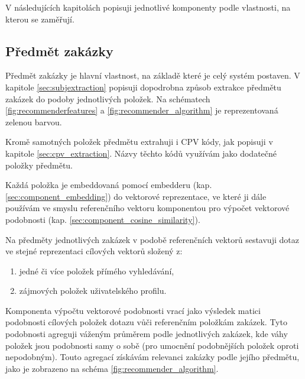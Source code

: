 \documentclass[thesis=M,czech]{FITthesis}[2019/12/23]
\begin{document}
V následujících kapitolách popisuji jednotlivé komponenty podle vlastnosti, na kterou se zaměřují.
\newpage

\subsection{Předmět zakázky}
\label{sec:feature_subject}

Předmět zakázky je hlavní vlastnost, na základě které je celý systém postaven. V kapitole \ref{sec:subjextraction} popisuji dopodrobna způsob extrakce předmětu zakázek do podoby jednotlivých položek. Na schématech \ref{fig:recommenderfeatures} a \ref{fig:recommender_algorithm} je reprezentovaná zelenou barvou.

Kromě samotných položek předmětu extrahuji i CPV kódy, jak popisuji v kapitole \ref{sec:cpv_extraction}. Názvy těchto kódů využívám jako dodatečné položky předmětu.

Každá položka je embeddovaná pomocí embedderu (kap. \ref{sec:component_embedding}) do vektorové reprezentace, ve které ji dále používám ve smyslu referenčního vektoru komponentou pro výpočet vektorové podobnosti (kap. \ref{sec:component_cosine_similarity}).

Na předměty jednotlivých zakázek v podobě referenčních vektorů sestavuji dotaz ve stejné reprezentaci cílových vektorů složený z:
\begin{enumerate}
    \item jedné či více položek přímého vyhledávání,
    \item zájmových položek uživatelského profilu.
\end{enumerate}

Komponenta výpočtu vektorové podobnosti vrací jako výsledek matici podobnosti cílových položek dotazu vůči referenčním položkám zakázek. Tyto podobnosti agreguji váženým průměrem podle jednotlivých zakázek, kde váhy položek jsou podobnosti samy o sobě (pro umocnění podobnějších položek oproti nepodobným). Touto agregací získávám relevanci zakázky podle jejího předmětu, jako je zobrazeno na schéma
\ref{fig:recommender_algorithm}.
\end{document}
